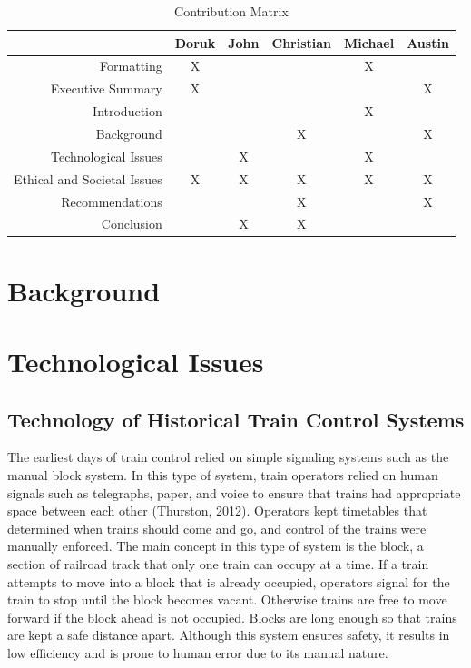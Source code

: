\documentclass[11pt, titlepage]{article}
\begin{document}
\begin{table}[htbp]
    \begin{tabular}{r|c c c c c }
        & Doruk & John & Christian & Michael & Austin\\
        \hline
        Formatting & X & & & X & \\
        Executive Summary & X & & & & X \\
        Introduction & & & & X & \\
        Background & & & X & & X\\
        Technological Issues & & X & & X & \\
        Ethical and Societal Issues & X & X & X & X & X\\
        Recommendations & & & X & & X\\
        Conclusion & & X & X & & \\
    \end{tabular}
    \caption{Contribution Matrix}
\end{table}

\clearpage
\pagebreak

\section{Background}

\pagebreak

\section{Technological Issues}

\subsection{Technology of Historical Train Control Systems}

The earliest days of train control relied on simple signaling systems such as the manual block system. In this type of system, train operators relied on human signals such as telegraphs, paper, and voice to ensure that trains had appropriate space between each other (Thurston, 2012). Operators kept timetables that determined when trains should come and go, and control of the trains were manually enforced. The main concept in this type of system is the block, a section of railroad track that only one train can occupy at a time. If a train attempts to move into a block that is already occupied, operators signal for the train to stop until the block becomes vacant. Otherwise trains are free to move forward if the block ahead is not occupied. Blocks are long enough so that trains are kept a safe distance apart. Although this system ensures safety, it results in low efficiency and is prone to human error due to its manual nature.
\end{document}
